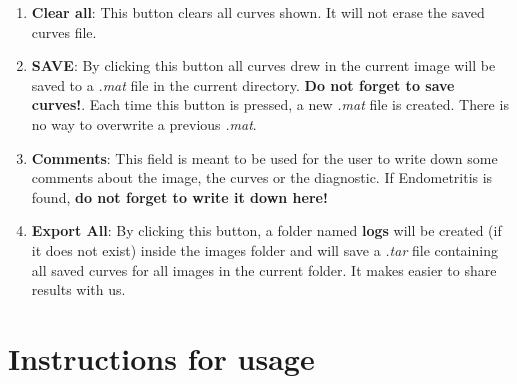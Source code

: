\documentclass[12pt,a4paper,titlepage]{report}
\begin{document}
\begin{enumerate}
	\item \textbf{Clear all}: This button clears all curves shown. It will not erase the saved curves file.
	\item \textbf{SAVE}: By clicking this button all curves drew in the current image will be saved to a \emph{.mat} file in the current directory. \textbf{Do not forget to save curves!}. Each time this button is pressed, a new \emph{.mat} file is created. There is no way to overwrite a previous \emph{.mat}.
	\item \textbf{Comments}: This field is meant to be used for the user to write down some comments about the image, the curves or the diagnostic. If Endometritis is found, \textbf{do not forget to write it down here!}
	\item \textbf{Export All}: By clicking this button, a folder named \textbf{logs} will be created (if it does not exist) inside the images folder and will save a \emph{.tar} file containing all saved curves for all images in the current folder. It makes easier to share results with us.
\end{enumerate}

\section{Instructions for usage}
\end{document}

